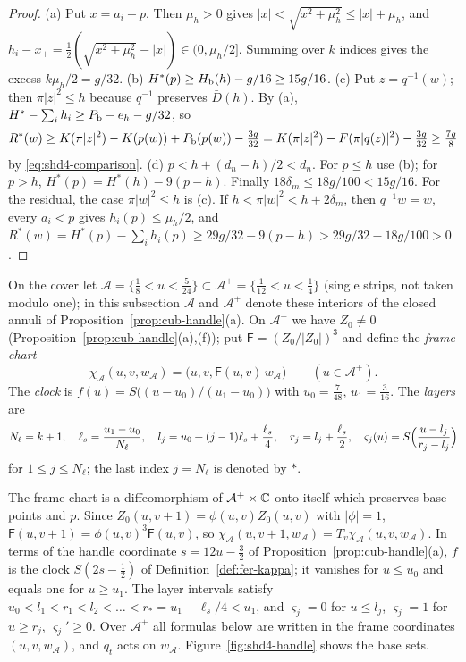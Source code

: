\begin{proof}
(a) Put $x=a_i-p$. Then $\mu_h>0$ gives $|x|<\sqrt{x^2+\mu_h^2}\le|x|+\mu_h$, and
$h_i-x_+=\frac12(\sqrt{x^2+\mu_h^2}-|x|)\in(0,\mu_h/2]$. Summing over $k$ indices gives the excess $k\mu_h/2=g/32$.
(b) $H^*(p)\ge H_{\mathrm b}(h)-g/16\ge15g/16$.
(c) Put $z=q^{-1}(w)$; then $\pi|z|^2\le h$ because $q^{-1}$ preserves $\bar D(h)$. By (a),
$H^*-\sum_ih_i\ge P_{\mathrm b}-e_h-g/32$, so
\[
 R^*(w)\ge K(\pi|z|^2)-K(p(w))+P_{\mathrm b}(p(w))-\tfrac{3g}{32}=K(\pi|z|^2)-F(\pi|q(z)|^2)-\tfrac{3g}{32}\ge\tfrac{7g}8
\]
by \eqref{eq:shd4-comparison}.
(d) $p<h+(d_n-h)/2<d_n$. For $p\le h$ use (b); for $p>h$, $H^*(p)=H^*(h)-9(p-h)$. Finally
$18\delta_m\le18g/100<15g/16$. For the residual, the case $\pi|w|^2\le h$ is (c). If $h<\pi|w|^2<h+2\delta_m$, then
$q^{-1}w=w$, every $a_i<p$ gives $h_i(p)\le\mu_h/2$, and $R^*(w)=H^*(p)-\sum_ih_i(p)\ge 29g/32-9(p-h)>29g/32-18g/100>0$.
\end{proof}

\begin{definition}\label{def:shd4-frame}
On the cover let $\mathcal A=\{\frac18<u<\frac5{24}\}\subset\mathcal A^+=\{\frac1{12}<u<\frac14\}$ (single strips, not taken
modulo one); in this subsection $\mathcal A$ and $\mathcal A^+$ denote these interiors of the closed annuli of
Proposition~\ref{prop:cub-handle}(a). On $\mathcal A^+$ we have $Z_0\ne0$ (Proposition~\ref{prop:cub-handle}(a),(f)); put
$\mathsf F=(Z_0/|Z_0|)^3$ and define the \emph{frame chart}
\[
 \chi_{\mathcal A}(u,v,w_{\mathcal A})=\bigl(u,v,\mathsf F(u,v)\,w_{\mathcal A}\bigr)\qquad(u\in\mathcal A^+).
\]
The \emph{clock} is $f(u)=S\bigl((u-u_0)/(u_1-u_0)\bigr)$ with $u_0=\frac7{48}$, $u_1=\frac3{16}$. The \emph{layers} are
\[
 N_\ell=k+1,\quad \ell_s=\frac{u_1-u_0}{N_\ell},\quad l_j=u_0+(j-1)\ell_s+\frac{\ell_s}4,\quad r_j=l_j+\frac{\ell_s}2,\quad
 \varsigma_j(u)=S\Bigl(\frac{u-l_j}{r_j-l_j}\Bigr)
\]
for $1\le j\le N_\ell$; the last index $j=N_\ell$ is denoted by $*$.
\end{definition}

The frame chart is a diffeomorphism of $\mathcal A^+\times\mathbb{C}$ onto itself which preserves base points and $p$. Since
$Z_0(u,v+1)=\phi(u,v)Z_0(u,v)$ with $|\phi|=1$, $\mathsf F(u,v+1)=\phi(u,v)^3\mathsf F(u,v)$, so
$\chi_{\mathcal A}(u,v+1,w_{\mathcal A})=T_v\chi_{\mathcal A}(u,v,w_{\mathcal A})$. In terms of the handle coordinate $s=12u-\frac32$ of
Proposition~\ref{prop:cub-handle}(a), $f$ is the clock $S(2s-\frac12)$ of Definition~\ref{def:fer-kappa}; it vanishes for
$u\le u_0$ and equals one for $u\ge u_1$. The layer intervals satisfy
$u_0<l_1<r_1<l_2<\dots<r_*=u_1-\ell_s/4<u_1$, and $\varsigma_j=0$ for $u\le l_j$, $\varsigma_j=1$ for $u\ge r_j$, $\varsigma_j'\ge0$.
Over $\mathcal A^+$ all formulas below are written in the frame coordinates $(u,v,w_{\mathcal A})$, and $q_t$ acts on
$w_{\mathcal A}$. Figure~\ref{fig:shd4-handle} shows the base sets.

